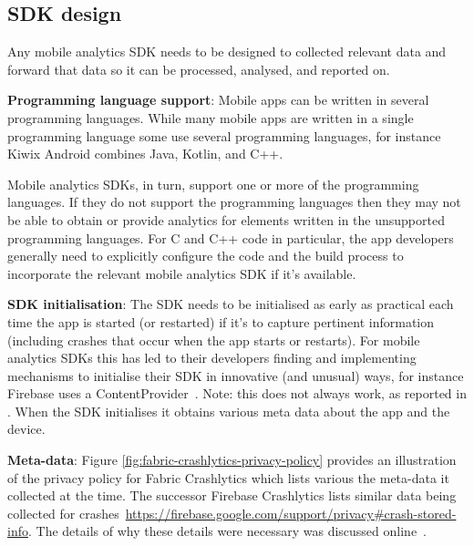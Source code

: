 \subsection{SDK design}
Any mobile analytics SDK needs to be designed to collected relevant data and forward that data so it can be processed, analysed, and reported on. 

\textbf{Programming language support}: 
Mobile apps %
can be written in several programming languages. While many mobile apps are written in a single programming language some use several programming languages, for instance Kiwix Android combines Java, Kotlin, and C++. 

Mobile analytics SDKs, in turn, support one or more of the programming languages. If they do not support the programming languages then they may not be able to obtain or provide analytics for elements written in the unsupported programming languages. For C and C++ code in particular, the app developers generally need to explicitly configure the code and the build process to incorporate the relevant mobile analytics SDK if it's available. %

\textbf{SDK initialisation}: 
The SDK needs to be initialised as early as practical each time the app is started (or restarted) if it's to capture pertinent information (including crashes that occur when the app starts or restarts). For mobile analytics SDKs this has led to their developers finding and implementing mechanisms to initialise their SDK in innovative (and unusual) ways, for instance Firebase uses a ContentProvider~\citep{stevenson2016_how_does_firebase_initialize_on_android}. Note: this does not always work, as reported in \citep{reddy2022_crashlytics_fails_to_track_app_startup_crashes}. When the SDK initialises it obtains various meta data about the app and the device. 

\textbf{Meta-data}: 
Figure \ref{fig:fabric-crashlytics-privacy-policy} provides an illustration of the privacy policy for Fabric Crashlytics which lists various the meta-data it collected at the time. The successor Firebase Crashlytics lists similar data being collected for crashes~\url{https://firebase.google.com/support/privacy#crash-stored-info}. The details of why these details were necessary was discussed online~\citep{kim2017_what_information_does_crashlytics_collect_from_end_users}.

